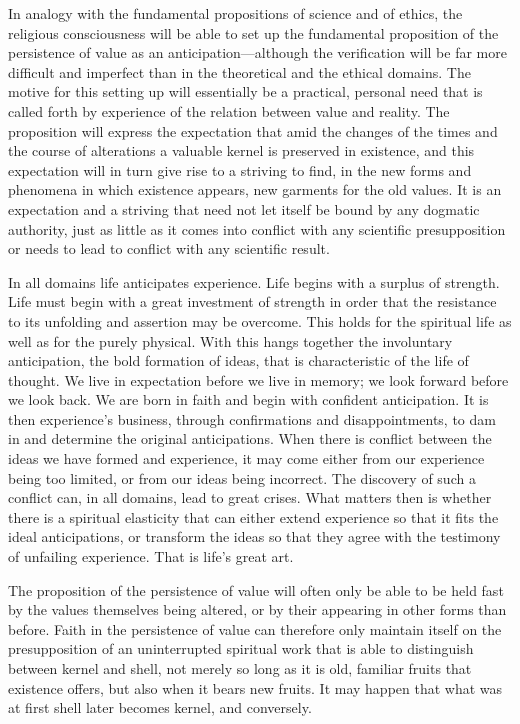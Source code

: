 \documentclass[12pt,a4paper]{book}
\newcommand{\opage}[1]{\marginnote{\footnotesize\textit{[#1]}}}
\begin{document}
In analogy with the fundamental propositions of science and of ethics, the religious consciousness
will be able to set up the fundamental proposition of the persistence of value as an
anticipation---although the verification will be far more difficult and imperfect than in the
theoretical and the ethical domains. The motive for this setting up will essentially be a practical,
personal need that is called forth by experience of the relation between value and reality. The
proposition will express the expectation that amid the changes of the times and the course of
alterations a valuable kernel is preserved in existence, and this expectation will in turn give rise
to a striving to find, in the new forms and phenomena in which existence appears, new garments for
the old values. It is an expectation and a striving that need not let itself be bound by any dogmatic
authority, just as little as it comes into conflict with any scientific presupposition or needs to
lead to conflict with any scientific result.

In all domains life anticipates experience. Life begins with a surplus of strength. Life must begin
with a great investment of strength in order that the resistance to its unfolding and assertion may
be overcome. This holds for the spiritual life as well as for the purely physical. With this hangs
together the involuntary anticipation, the bold formation of ideas, that is 
\opage{169}characteristic of the
life of thought. We live in expectation before we live in memory; we look forward before we look
back. We are born in faith and begin with confident anticipation. It is then experience's business,
through confirmations and disappointments, to dam in and determine the original anticipations. When
there is conflict between the ideas we have formed and experience, it may come either from our
experience being too limited, or from our ideas being incorrect. The discovery of such a conflict
can, in all domains, lead to great crises. What matters then is whether there is a spiritual
elasticity that can either extend experience so that it fits the ideal anticipations, or transform
the ideas so that they agree with the testimony of unfailing experience. That is life's great art.

The proposition of the persistence of value will often only be able to be held fast by the values
themselves being altered, or by their appearing in other forms than before. Faith in the persistence
of value can therefore only maintain itself on the presupposition of an uninterrupted spiritual work
that is able to distinguish between kernel and shell, not merely so long as it is old, familiar
fruits that existence offers, but also when it bears new fruits. It may happen that what was at
first shell later becomes kernel, and conversely.
\end{document}
